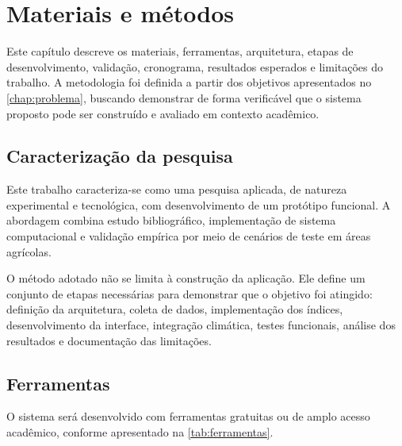 \chapter{Materiais e métodos}\label{chap:materiais}

Este capítulo descreve os materiais, ferramentas, arquitetura, etapas de desenvolvimento, validação, cronograma, resultados esperados e limitações do trabalho. A metodologia foi definida a partir dos objetivos apresentados no \cref{chap:problema}, buscando demonstrar de forma verificável que o sistema proposto pode ser construído e avaliado em contexto acadêmico.

\section{Caracterização da pesquisa}

Este trabalho caracteriza-se como uma pesquisa aplicada, de natureza experimental e tecnológica, com desenvolvimento de um protótipo funcional. A abordagem combina estudo bibliográfico, implementação de sistema computacional e validação empírica por meio de cenários de teste em áreas agrícolas.

O método adotado não se limita à construção da aplicação. Ele define um conjunto de etapas necessárias para demonstrar que o objetivo foi atingido: definição da arquitetura, coleta de dados, implementação dos índices, desenvolvimento da interface, integração climática, testes funcionais, análise dos resultados e documentação das limitações.

\section{Ferramentas}

O sistema será desenvolvido com ferramentas gratuitas ou de amplo acesso acadêmico, conforme apresentado na \cref{tab:ferramentas}.

